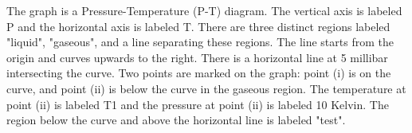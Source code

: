 The graph is a Pressure-Temperature (P-T) diagram. The vertical axis is labeled P and the horizontal axis is labeled T. There are three distinct regions labeled "liquid", "gaseous", and a line separating these regions. The line starts from the origin and curves upwards to the right. There is a horizontal line at 5 millibar intersecting the curve. Two points are marked on the graph: point (i) is on the curve, and point (ii) is below the curve in the gaseous region. The temperature at point (ii) is labeled T1 and the pressure at point (ii) is labeled 10 Kelvin. The region below the curve and above the horizontal line is labeled "test".